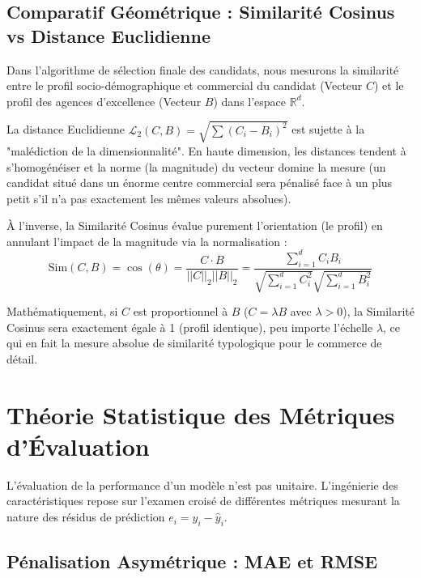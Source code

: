 \documentclass[11pt,a4paper,twoside]{report}
\begin{document}
\subsection{Comparatif Géométrique : Similarité Cosinus vs Distance Euclidienne}

Dans l'algorithme de sélection finale des candidats, nous mesurons la similarité entre le profil socio-démographique et commercial du candidat (Vecteur $C$) et le profil des agences d'excellence (Vecteur $B$) dans l'espace $\mathbb{R}^d$.

La distance Euclidienne $\mathcal{L}_2(C, B) = \sqrt{\sum (C_i - B_i)^2}$ est sujette à la "malédiction de la dimensionnalité". En haute dimension, les distances tendent à s'homogénéiser et la norme (la magnitude) du vecteur domine la mesure (un candidat situé dans un énorme centre commercial sera pénalisé face à un plus petit s'il n'a pas exactement les mêmes valeurs absolues).

À l'inverse, la Similarité Cosinus évalue purement l'orientation (le profil) en annulant l'impact de la magnitude via la normalisation :
\begin{equation}
\text{Sim}(C, B) = \cos(\theta) = \frac{C \cdot B}{||C||_2 ||B||_2} = \frac{\sum_{i=1}^{d} C_i B_i}{\sqrt{\sum_{i=1}^{d} C_i^2} \sqrt{\sum_{i=1}^{d} B_i^2}}
\end{equation}

Mathématiquement, si $C$ est proportionnel à $B$ ($C = \lambda B$ avec $\lambda > 0$), la Similarité Cosinus sera exactement égale à 1 (profil identique), peu importe l'échelle $\lambda$, ce qui en fait la mesure absolue de similarité typologique pour le commerce de détail.

\section{Théorie Statistique des Métriques d'Évaluation}

L'évaluation de la performance d'un modèle n'est pas unitaire. L'ingénierie des caractéristiques repose sur l'examen croisé de différentes métriques mesurant la nature des résidus de prédiction $e_i = y_i - \hat{y}_i$.

\subsection{Pénalisation Asymétrique : MAE et RMSE}
\end{document}
